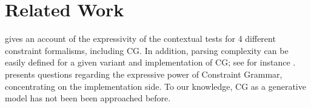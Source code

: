 \documentclass[11pt]{article}
\begin{document}
\section{Related Work}
 gives an account of the expressivity of
the contextual tests for 4 different constraint formalisms, including CG. 
In addition, parsing complexity can be easily defined for a given variant and 
implementation of CG; see for instance .
 presents questions regarding the expressive power
of Constraint Grammar, concentrating on the implementation side.
To our knowledge, CG as a generative model has not been been approached before.

\clearpage


\end{document}
